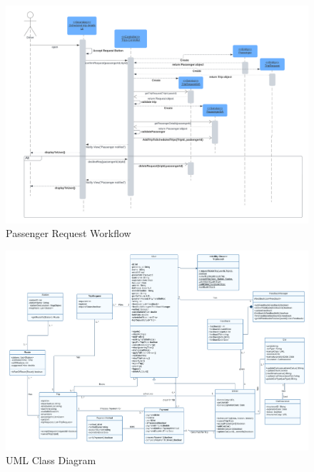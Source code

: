 \documentclass[a4paper, 12pt]{article} %
\begin{document}
        \begin{figure}
            \centering
            \includegraphics[width=\linewidth]{Images/Driver Request.png}
            \caption{Passenger Request Workflow}
            \label{fig:seq_dig_driver_request}
        \end{figure}


        \begin{figure}
            \centering
            \includegraphics[width=\linewidth]{Images/UML Class.png}
            \caption{UML Class Diagram}
            \label{fig:class_diagram}
        \end{figure}
        
\end{document}
